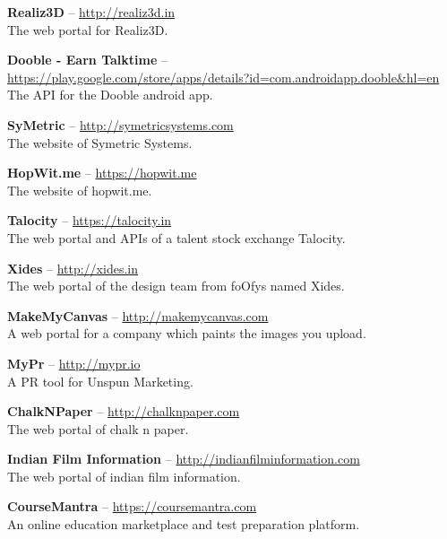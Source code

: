 \documentclass[11pt,a4paper]{moderncv}
\begin{document}
\cvlistitem
{\textbf{Realiz3D} -- {\small \href{http://realiz3d.in}{http://realiz3d.in}}  
  \\The web portal for Realiz3D.
}

\cvlistitem
{\textbf{Dooble - Earn Talktime} -- \\ {\small \href{https://play.google.com/store/apps/details?id=com.androidapp.dooble\&hl=en}{https://play.google.com/store/apps/details?id=com.androidapp.dooble\&hl=en}}  
  \\The API for the Dooble android app.
}

\cvlistitem
{\textbf{SyMetric} -- {\small \href{http://symetricsystems.com}{http://symetricsystems.com}}  
  \\The website of Symetric Systems.
}

\cvlistitem
{\textbf{HopWit.me} -- {\small \href{https://hopwit.me}{https://hopwit.me}}  
  \\The website of hopwit.me.
}

\cvlistitem
{\textbf{Talocity} -- {\small \href{https://talocity.in}{https://talocity.in}}  
  \\The web portal and APIs of a talent stock exchange Talocity.
}

\cvlistitem
{\textbf{Xides} -- {\small \href{http://xides.in}{http://xides.in}}
  \\The web portal of the design team from foOfys named Xides.
}

\cvlistitem
{\textbf{MakeMyCanvas} -- {\small \href{http://makemycanvas.com}{http://makemycanvas.com}}
  \\A web portal for a company which paints the images you upload.
}

\cvlistitem
{\textbf{MyPr} -- {\small \href{http://mypr.io}{http://mypr.io}}
  \\A PR tool for Unspun Marketing.
}

\cvlistitem
{\textbf{ChalkNPaper} -- {\small \href{http://chalknpaper.com}{http://chalknpaper.com}}
  \\The web portal of chalk n paper.
}

\cvlistitem
{\textbf{Indian Film Information} -- {\small \href{http://indianfilminformation.com}{http://indianfilminformation.com}}
  \\The web portal of indian film information.
}

\cvlistitem
{\textbf{CourseMantra} -- {\small \href{https://coursemantra.com}{https://coursemantra.com}}
  \\An online education marketplace and test preparation platform.
}
\end{document}
